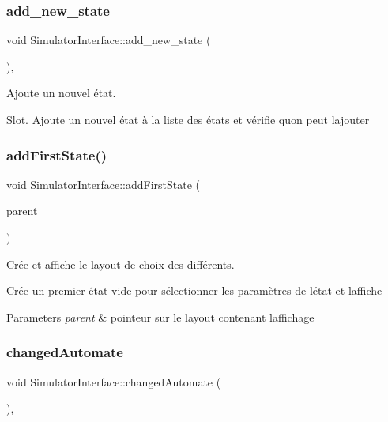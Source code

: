 \subsubsection{\texorpdfstring{add\+\_\+new\+\_\+state}{add\_new\_state}}
{\footnotesize\ttfamily void Simulator\+Interface\+::add\+\_\+new\+\_\+state (\begin{DoxyParamCaption}{ }\end{DoxyParamCaption})\hspace{0.3cm}{\ttfamily [protected]}, {\ttfamily [slot]}}



Ajoute un nouvel état. 

Slot. Ajoute un nouvel état à la liste des états et vérifie qu\textquotesingle{}on peut l\textquotesingle{}ajouter \mbox{\label{class_simulator_interface_a2f46c39ef7fca910be2f5cc377850ff4}} 
\subsubsection{\texorpdfstring{add\+First\+State()}{addFirstState()}}
{\footnotesize\ttfamily void Simulator\+Interface\+::add\+First\+State (\begin{DoxyParamCaption}\item[{Q\+Box\+Layout $\ast$}]{parent }\end{DoxyParamCaption})\hspace{0.3cm}{\ttfamily [protected]}}



Crée et affiche le layout de choix des différents. 

Crée un premier état vide pour sélectionner les paramètres de l\textquotesingle{}état et l\textquotesingle{}affiche 
\begin{DoxyParams}{Parameters}
{\em parent} & pointeur sur le layout contenant l\textquotesingle{}affichage \\
\hline
\end{DoxyParams}
\mbox{\label{class_simulator_interface_adfd1e916c7058a3c6fb1115af26236c3}} 
\subsubsection{\texorpdfstring{changed\+Automate}{changedAutomate}}
{\footnotesize\ttfamily void Simulator\+Interface\+::changed\+Automate (\begin{DoxyParamCaption}{ }\end{DoxyParamCaption})\hspace{0.3cm}{\ttfamily [protected]}, {\ttfamily [slot]}}



